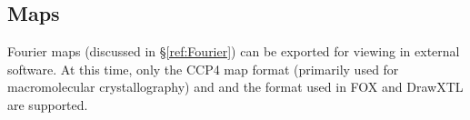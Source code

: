 \subsection{Maps}
Fourier maps (discussed in \S\ref{ref:Fourier}) can be exported for viewing in external software. At this time, only the CCP4 map format (primarily used for macromolecular crystallography) and and the format used in FOX and DrawXTL are supported. 

